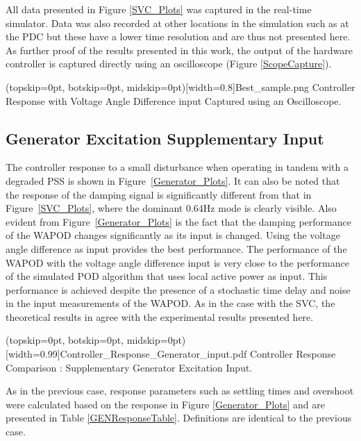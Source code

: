\documentclass{ieeeaccess}
\begin{document}
All data presented in Figure \ref{SVC_Plots} was captured in the real-time simulator. Data was also recorded at other locations in the simulation such as at the PDC but these have a lower time resolution and are thus not presented here. As further proof of the results presented in this work, the output of the hardware controller is captured directly using an oscilloscope (Figure \ref{ScopeCapture}).

\Figure[tbp!](topskip=0pt, botskip=0pt, midskip=0pt)[width=0.8\columnwidth]{Best_sample.png}
{Controller Response with Voltage Angle Difference input Captured using an Oscilloscope.\label{ScopeCapture}}

\subsection{Generator Excitation Supplementary Input}
The controller response to a small disturbance when operating in tandem with a degraded PSS is shown in Figure~\ref{Generator_Plots}. It can also be noted that the response of the damping signal is significantly different from that in Figure~\ref{SVC_Plots}, where the dominant 0.64Hz mode is clearly visible. Also evident from Figure~\ref{Generator_Plots} is the fact that the damping performance of the WAPOD changes significantly as its input is changed. Using the voltage angle difference as input provides the best performance. The performance of the WAPOD with the voltage angle difference input is very close to the performance of the simulated POD algorithm that uses local active power as input. This performance is achieved despite the presence of a stochastic time delay and noise in the input measurements of the WAPOD. As in the case with the SVC, the theoretical results in \cite{Yuwa} agree with the experimental results presented here.

\Figure[tbp](topskip=0pt, botskip=0pt, midskip=0pt)[width=0.99\columnwidth]{Controller_Response_Generator_input.pdf}
{Controller Response Comparison : Supplementary Generator Excitation Input.\label{Generator_Plots}}

As in the previous case, response parameters such as settling times and overshoot were calculated based on the response in Figure \ref{Generator_Plots} and are presented in Table \ref{GENResponseTable}. Definitions are identical to the previous case.
\end{document}
